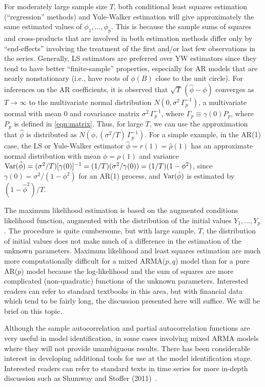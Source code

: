 For moderately large sample size $T$, both conditional least squares estimation (``regression'' methods) and Yule-Walker estimation will give approximately the same estimated values of $\phi_1, \ldots, \phi_p$. This is because the sample sums of squares and cross-products that are involved in both estimation methods differ only by ``end-effects'' involving the treatment of the first and/or last few observations in the series. Generally, LS estimators are preferred over YW estimators since they tend to have better ``finite-sample'' properties, especially for AR models that are nearly nonstationary (i.e., have roots of $\phi(B)$ close to the unit circle). For inferences on the AR coefficients, it is observed that $\sqrt{T}\,(\hat{\phi} - \phi)$ converges as $T \to \infty$ to the multivariate normal distribution $N(0,\sigma^2\,\Gamma_p^{-1})$, a multivariate normal with mean 0 and covariance matrix $\sigma^2\,\Gamma_p^{-1}$, where $\Gamma_p \equiv \gamma(0)P_p$, where $P_p$ is defined in \eqref{eqn:matrix}. Thus, for large $T$, we can use the approximation that $\hat{\phi}$ is distributed as $N(\phi,(\sigma^2/T)\,\Gamma_p^{-1})$. For a simple example, in the AR(1) case, the LS or Yule-Walker estimator $\hat{\phi} = r(1) = \hat{\rho}(1)$ has an approximate normal distribution with mean $\phi = \rho(1)$ and variance $\operatorname{Var}(\hat{\phi}) = (\sigma^2/T)[\gamma(0)]^{-1} = (1/T)(\sigma^2/\gamma(0)) = (1/T)(1 - \phi^2)$, since $\gamma(0) = \sigma^2/(1 - \phi^2)$ for an AR(1) process, and $\operatorname{Var}(\hat{\phi})$ is estimated by $(1 - \hat{\phi}^2)/T$.


The maximum likelihood estimation is based on the augmented conditions likelihood function, augmented with the distribution of the initial values $Y_1, \ldots, Y_p$. The procedure is quite cumbersome, but with large sample, $T$, the distribution of initial values does not make much of a difference in the estimation of the unknown parameters. Maximum likelihood and least squares estimation are much more computationally difficult for a mixed ARMA($p,q$) model than for a pure AR($p$) model because the log-likelihood and the sum of squares are more complicated (non-quadratic) functions of the unknown parameters. Interested readers can refer to standard textbooks in this area, but with financial data which tend to be fairly long, the discussion presented here will suffice. We will be brief on this topic.


Although the sample autocorrelation and partial autocorrelation functions are very useful in model identification, in some cases involving mixed ARMA models where they will not provide unambiguous results. There has been considerable interest in developing additional tools for use at the model identification stage. Interested readers can refer to standard texts in time series for more in-depth discussion such as Shumway and Stoffer (2011)~\cite{shumway2011arima}.


